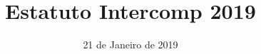 \documentclass[11pt]{report}
\title{Estatuto Intercomp 2019}
\date{21 de Janeiro de 2019}
\begin{document}





\noindent
\tableofcontents
\newpage














\end{document}
